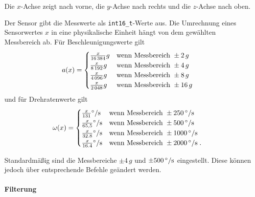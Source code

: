 Die $x$-Achse zeigt nach vorne, die $y$-Achse nach rechts und die $z$-Achse nach oben.

Der Sensor gibt die Messwerte als \texttt{int16\_t}-Werte aus. Die Umrechnung eines Sensorwertes $x$ in eine physikalische Einheit hängt von dem gewählten Messbereich ab. Für Beschleunigungswerte gilt
\begin{align*}
	a(x)
		=
			\begin{cases}
				\frac{x}{16\,384} g & \textnormal{wenn Messbereich } \pm 2\,g \\
				\frac{x}{8\,192} g & \textnormal{wenn Messbereich } \pm 4\,g \\
				\frac{x}{4\,096} g & \textnormal{wenn Messbereich } \pm 8\,g \\
				\frac{x}{2\,048} g & \textnormal{wenn Messbereich } \pm 16\,g 
			\end{cases}
\end{align*}
und für Drehratenwerte gilt
\begin{align*}
	\omega(x)
		=
			\begin{cases}
				\frac{x}{131} \mrm{\degree / s} & \tn{wenn Messbereich } \pm \valunit{250}{\degree / s} \\
				\frac{x}{65,5} \mrm{\degree / s} & \tn{wenn Messbereich } \pm \valunit{500}{\degree / s} \\
				\frac{x}{32.8} \mrm{\degree / s} & \tn{wenn Messbereich } \pm \valunit{1000}{\degree / s} \\
				\frac{x}{16.4} \mrm{\degree / s} & \tn{wenn Messbereich } \pm \valunit{2000}{\degree / s}\;.
			\end{cases}
\end{align*}

Standardmäßig sind die Messbereiche $\pm 4\,g$ und $\pm \valunit{500}{\degree / s}$ eingestellt. \textcolor[rgb]{0.75,0.75,0.75}{Diese können jedoch über entsprechende Befehle geändert werden.}


\paragraph{Filterung}




